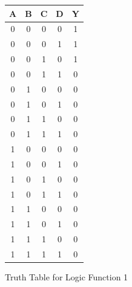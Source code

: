 \documentclass[a4paper,12pt]{article}
\begin{document}
\newpage
\begin{figure}
\begin{center}
\caption{Truth Table for Logic Function 1}
\begin{tabular}{ |c|c|c|c||c| } 
 \hline
 A & B & C & D & Y\\
 \hline
 0 & 0 & 0 & 0 & 1\\
 0 & 0 & 0 & 1 & 1\\
 0 & 0 & 1 & 0 & 1\\
 0 & 0 & 1 & 1 & 0\\
 \hline
 0 & 1 & 0 & 0 & 0\\
 0 & 1 & 0 & 1 & 0\\
 0 & 1 & 1 & 0 & 0\\
 0 & 1 & 1 & 1 & 0\\
 \hline
 1 & 0 & 0 & 0 & 0\\
 1 & 0 & 0 & 1 & 0\\
 1 & 0 & 1 & 0 & 0\\
 1 & 0 & 1 & 1 & 0\\
 \hline
 1 & 1 & 0 & 0 & 0\\
 1 & 1 & 0 & 1 & 0\\
 1 & 1 & 1 & 0 & 0\\
 1 & 1 & 1 & 1 & 0\\
 \hline
\end{tabular}
\label{fig:TruthTable1}
\end{center}
\end{figure}

\newpage
\vspace*{\fill}
\end{document}
